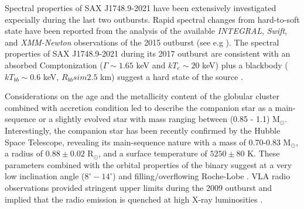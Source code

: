 \documentclass[graybox]{svmult}
\def \inte {{\em INTEGRAL\xspace}}
\def \swift {{\em Swift\xspace}}
\def \xmm {{\em XMM-Newton\xspace}}
\begin{document}
Spectral properties of SAX J1748.9-2021 have been extensively investigated expecially during the last two outbursts. Rapid spectral changes from hard-to-soft state have been reported from the analysis of the available \inte{}, \swift{}, and \xmm{} observations of the 2015 outburst (see e.g \cite{Li2018,Pintore2016}). The spectral properties of SAX J1748.9-2021 during its 2017 outburst are consistent with an absorbed Comptonization ($\Gamma\sim 1.65$ keV and $kT_e\sim 20$ keV) plus a blackbody ($kT_{bb}\sim0.6$ keV, $R_{bb}sim2.5$ km) suggest a hard state of the source \cite{Pintore2018}.
 
Considerations on the age and the metallicity content of the globular cluster combined with accretion condition led \cite{Altamirano2008} to describe the companion star as a main-sequence or a slightly evolved star with mass ranging between (0.85 - 1.1) M$_\odot$. Interestingly, the companion star has been recently confirmed by the Hubble Space Telescope, revealing its main-sequence nature with a mass of 0.70-0.83 M$_\odot$, a radius of $0.88\pm0.02$ R$_\odot$, and a surface temperature of $5250\pm80$ K. These parameters combined with the orbital properties of the binary suggest at a very low inclination angle ($8^\circ-14^\circ$) and filling/overflowing Roche-Lobe \cite{Cadelano2017}. VLA radio observations provided stringent upper limits during the 2009 outburst and implied that the radio emission is quenched at high X-ray luminosities \cite{MillerJones2010b}.
\end{document}
